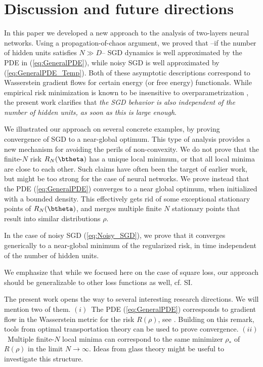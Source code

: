 \documentclass[11pt]{article}
\renewcommand{\eqref}[1]{(\ref{#1})}
\begin{document}
\section{Discussion and future directions}
\label{sec:Ext}

In this paper we developed a new approach to the analysis of two-layers neural networks.
Using a propagation-of-chaos argument, we proved that --if  the number of hidden units satisfies $N\gg D $--
 SGD dynamics is well approximated by the PDE in \eqref{eq:GeneralPDE}, while noisy SGD is well approximated by \eqref{eq:GeneralPDE_Temp}.
Both of these asymptotic descriptions correspond to Wasserstein gradient flows for certain energy (or free energy) functionals.
While empirical risk minimization is known to be insensitive to overparametrization \cite{bartlett1998sample},
the present work clarifies that \emph{the SGD behavior is also
independent of the number of hidden units, as soon as this is large enough}.

We illustrated our approach on several concrete examples, by proving convergence of SGD to a near-global
optimum.  This type of analysis provides a new mechanism for avoiding the perils of non-convexity.
We do not prove that the finite-$N$  risk $R_{N}(\btheta)$ has a unique local minimum, or that all local minima are 
close to each other. Such claims have often been the target of earlier work, but might be too strong for the
case of neural networks. 
We prove instead that the PDE \eqref{eq:GeneralPDE} converges to a near global optimum, when initialized with a bounded 
density. This effectively gets rid of some exceptional stationary points of $R_{N}(\btheta)$,
and  merges multiple finite $N$ stationary points that  result into similar distributions $\rho$. 

In the case of noisy SGD \eqref{eq:Noisy_SGD}, we prove that it converges generically to a near-global
minimum of the regularized risk, in time independent of the number of hidden units.

We emphasize that while we focused here on the case of square loss, our approach should be generalizable to other loss functions
as well, cf. SI.

The present work opens the way to several interesting research directions. We will mention two of them.
$(i)$~The PDE \eqref{eq:GeneralPDE}  corresponds to gradient flow in the Wasserstein metric for the risk $R(\rho)$,
see \cite{ambrosio2008gradient}. Building on this remark, tools from optimal transportation theory can be used to prove convergence.
$(ii)$~Multiple finite-$N$ local minima can correspond to the same  minimizer $\rho_*$ of $R(\rho)$ in the limit
$N\to\infty$. Ideas from glass theory \cite{mezard1999thermodynamics} might be useful to investigate this structure.
\end{document}
